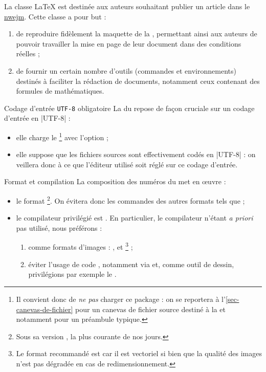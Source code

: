 \documentclass[french,nolocaltoc]{nwejmart}
\newtheorem[style=definition]{fait}
\newtheorem[title=expérience]{experience}
\newtheorem[title-plural=anneaux]{anneau}
\newtheorem[title=idéal,title-plural=idéaux]{ideal}
\begin{document}
La classe \LaTeX{} \nwejmauthor{} est destinée aux auteurs souhaitant publier un
article dans le \href{http://math.univ-lille1.fr/~nwejm/}{\gls{nwejm}}. Cette
classe a pour but :
\begin{enumerate}
\item de reproduire fidèlement la maquette de la \nwejm{}, permettant ainsi
  aux auteurs de pouvoir travailler la mise en page de leur document dans des
  conditions réelles ;
\item de fournir un certain nombre d'outils (commandes et environnements)
  destinés à faciliter la rédaction de documents, notamment ceux contenant des
  formules de mathématiques.
\end{enumerate}

\begin{dbwarning}{Codage d'entrée \protect\lstinline+UTF-8+ obligatoire}{}
  La \nwejmauthorcl{} du \nwejm{} repose de façon cruciale sur un codage
  d'entrée en |UTF-8| :
  \begin{itemize}
  \item elle charge le \footnote{%
      Il convient donc de \emph{ne pas} charger ce package : on se reportera
      à l'\vref{sec-canevas-de-fichier} pour un canevas de fichier source
      destiné à la \nwejm{} et notamment pour un préambule typique.%
    }
    avec l'option  ;
  \item elle suppose que les fichiers sources  sont effectivement
    codés en |UTF-8| : on veillera donc à ce que l'éditeur utilisé soit réglé
    sur ce codage d'entrée.
  \end{itemize}
\end{dbwarning}

\begin{dbwarning}{Format et compilation }{}
  La composition des numéros du \nwejm*{} met en œuvre :
  \begin{itemize}
  \item le format \footnote{Sous sa version , la
      plus courante de nos jours.}. On évitera donc les commandes des autres
    formats tels que  ;
  \item le compilateur privilégié est . En particulier, le
    compilateur  n'étant \emph{a priori} pas utilisé, nous
    préférons :
    \begin{enumerate}
    \item comme formats d'images : ,  et
      \footnote{Le format recommandé est  car il est
        vectoriel si bien que la qualité des images n'est pas dégradée en cas de
        redimensionnement.} ;
    \item éviter l'usage de code , notamment via
       et, comme outil de dessin, privilégions par exemple le
      .
    \end{enumerate}
  \end{itemize}
\end{dbwarning}
\end{document}
